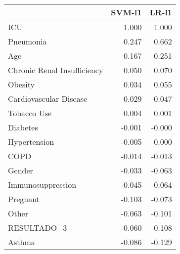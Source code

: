 \begin{tabular}{lrr}
\toprule
{} &  SVM-l1 &  LR-l1 \\
\midrule
ICU                         &   1.000 &  1.000 \\
Pneumonia                   &   0.247 &  0.662 \\
Age                         &   0.167 &  0.251 \\
Chronic Renal Insufficiency &   0.050 &  0.070 \\
Obesity                     &   0.034 &  0.055 \\
Cardiovascular Disease      &   0.029 &  0.047 \\
Tobacco Use                 &   0.004 &  0.001 \\
Diabetes                    &  -0.001 & -0.000 \\
Hypertension                &  -0.005 &  0.000 \\
COPD                        &  -0.014 & -0.013 \\
Gender                      &  -0.033 & -0.063 \\
Immunosuppression           &  -0.045 & -0.064 \\
Pregnant                    &  -0.103 & -0.073 \\
Other                       &  -0.063 & -0.101 \\
RESULTADO\_3                 &  -0.060 & -0.108 \\
Asthma                      &  -0.086 & -0.129 \\
\bottomrule
\end{tabular}

